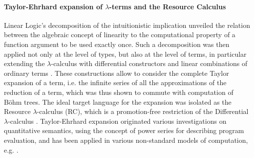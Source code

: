 \paragraph{Taylor-Ehrhard expansion of $\lambda$-terms and the Resource 
Calculus}
Linear Logic's decomposition of the intuitionistic implication unveiled the 
relation between the algebraic concept of linearity to the computational 
property of a function argument to be used exactly once.
Such a decomposition was then applied not only at the level of types, but also 
at the level of terms, in particular extending the $\lambda$-calculus with 
differential constructors and linear combinations of ordinary terms 
\cite{EhrhardRegnier:2003}.
These constructions allow to consider the complete Taylor expansion of a term, 
i.e. the infinite series of all the approximations of the reduction of a term, 
which was thus shown to commute with computation of Böhm trees.
The ideal target language for the expansion was isolated as the Resource 
$\lambda$-calculus (RC), which is a promotion-free restriction of the 
Differential $\lambda$-calculus \cite{EhrhardRegnier:2006}.
Taylor-Ehrhard expansion originated various investigations on quantitative 
semantics, using the concept of power series for describing program evaluation, 
and has been applied in various non-standard models of computation, e.g.
\cite[for instance]{DanosEhrhard:2011,PaganiSelingerValiron:2014}.


